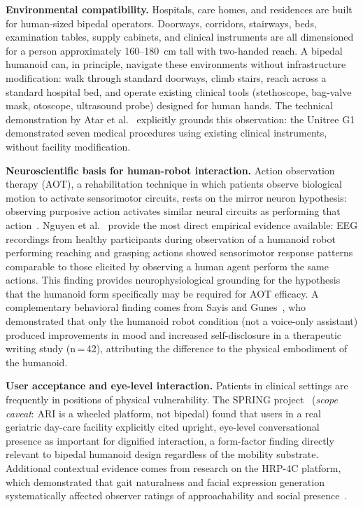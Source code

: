 \documentclass[acmjour]{acmart}
\begin{document}
\textbf{Environmental compatibility.} Hospitals, care homes, and residences are
built for human-sized bipedal operators. Doorways, corridors, stairways, beds,
examination tables, supply cabinets, and clinical instruments are all dimensioned
for a person approximately 160--180~cm tall with two-handed reach. A bipedal
humanoid can, in principle, navigate these environments without infrastructure
modification: walk through standard doorways, climb stairs, reach across a
standard hospital bed, and operate existing clinical tools (stethoscope,
bag-valve mask, otoscope, ultrasound probe) designed for human hands. The
technical demonstration by Atar et al.~\cite{atar2025humanoids} explicitly grounds
this observation: the Unitree G1 demonstrated seven medical procedures using
existing clinical instruments, without facility modification.

\textbf{Neuroscientific basis for human-robot interaction.} Action observation
therapy (AOT), a rehabilitation technique in which patients observe biological
motion to activate sensorimotor circuits, rests on the mirror neuron hypothesis:
observing purposive action activates similar neural circuits as performing that
action~\cite{rizzolatti2004mirror}. Nguyen et al.~\cite{nguyen2024eeg} provide the most direct empirical
evidence available: EEG recordings from healthy participants during observation of
a humanoid robot performing reaching and grasping actions showed sensorimotor
response patterns comparable to those elicited by observing a human agent perform
the same actions. This finding provides neurophysiological grounding for the
hypothesis that the humanoid form specifically may be required for AOT efficacy.
A complementary behavioral finding comes from Sayis and
Gunes~\cite{sayis2024technology}, who demonstrated that only the humanoid robot
condition (not a voice-only assistant) produced improvements in mood and
increased self-disclosure in a therapeutic writing study (n\,=\,42), attributing
the difference to the physical embodiment of the humanoid.

\textbf{User acceptance and eye-level interaction.} Patients in clinical settings
are frequently in positions of physical vulnerability. The SPRING
project~\cite{alamedapineda2024spring} (\emph{scope caveat}: ARI is a wheeled
platform, not bipedal) found that users in a real geriatric day-care facility
explicitly cited upright, eye-level conversational presence as important for
dignified interaction, a form-factor finding directly relevant to bipedal
humanoid design regardless of the mobility substrate. Additional contextual
evidence comes from research on the HRP-4C platform, which demonstrated that
gait naturalness and facial expression generation systematically affected observer
ratings of approachability and social presence~\cite{cao2025humanoid}.
\end{document}
